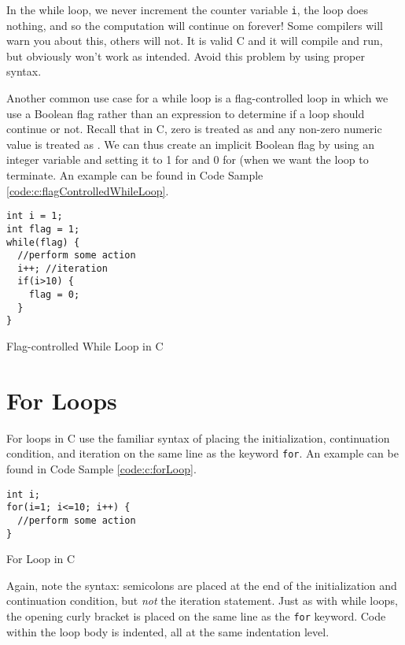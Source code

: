 In the while loop, we never increment the counter variable \texttt{i}, 
the loop does nothing, and so the computation will continue on
forever!  Some compilers will warn you about this, others will not.  It
is valid C and it will compile and run, but obviously won't work as intended.
Avoid this problem by using proper syntax.

Another common use case for a while loop is a flag-controlled loop in which
we use a Boolean flag rather than an expression to determine if a loop
should continue or not.  Recall that in C, zero is treated as \False and 
any non-zero numeric value is treated as \True.  We can thus create an
implicit Boolean flag by using an integer variable and setting it to 1 for
\True and 0 for \False (when we want the loop to terminate.  An example
can be found in Code Sample \ref{code:c:flagControlledWhileLoop}.

\begin{listing}
\begin{verbatim}
int i = 1;
int flag = 1;
while(flag) {
  //perform some action
  i++; //iteration  
  if(i>10) {
    flag = 0;
  }
}
\end{verbatim}
  \caption{Flag-controlled While Loop in C}
  \label{code:c:flagControlledWhileLoop}
\end{listing}

\section{For Loops}

For loops in C use the familiar syntax of placing the initialization, continuation
condition, and iteration on the same line as the keyword \texttt{for}.
An example can be found in Code Sample \ref{code:c:forLoop}.

\begin{listing}[H]
\begin{verbatim}
int i;
for(i=1; i<=10; i++) {
  //perform some action
}
\end{verbatim}
  \caption{For Loop in C}
  \label{code:c:forLoop}
\end{listing}

Again, note the syntax: semicolons are placed at the end of the initialization and
continuation condition, but \emph{not} the iteration statement.  Just as with while
loops, the opening curly bracket is placed on the same line as the \texttt{for}
keyword.  Code within the loop body is indented, all at the same indentation level.

